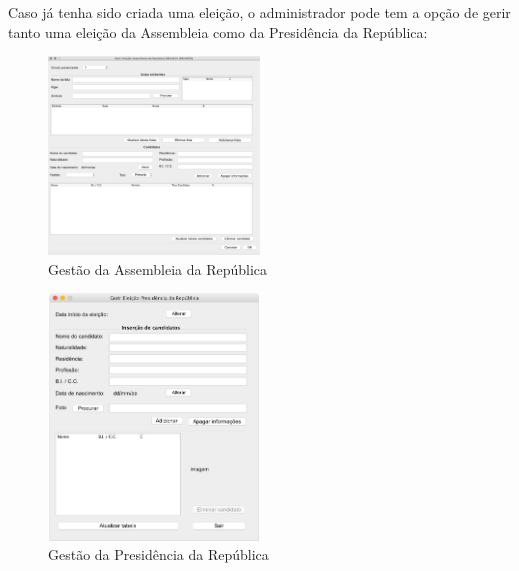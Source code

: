 \documentclass[a4paper,12pt]{report}
\begin{document}
Caso já tenha sido criada uma eleição, o administrador pode tem a opção de gerir tanto uma eleição da Assembleia como da Presidência da República:
\begin{figure}[H]
\begin{center}
	\includegraphics[width=0.5\textwidth]{media/img_interface/img11.jpg}
	 \caption{Gestão da Assembleia da República}
\end{center}
\end{figure}
\begin{figure}[H]
\begin{center}
	\includegraphics[width=0.5\textwidth]{media/img_interface/img7.jpg}
	 \caption{Gestão da Presidência da República}
\end{center}
\end{figure}
\newpage
\end{document}

